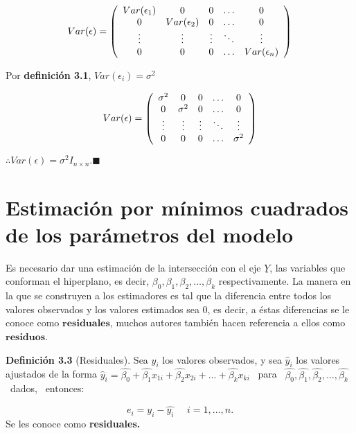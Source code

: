 \documentclass[
  a4paper,
  oneside,
  openany]{book}
\begin{document}
\[
Var(\epsilon)=
\left(
\begin{array}{c c c c c}
Var(\epsilon_{1}) & 0 & 0 & \ldots & 0 \\ 
0&Var(\epsilon_{2}) & 0 & \ldots & 0 \\
\vdots & \vdots & \vdots & \ddots & \vdots\\
0 & 0 & 0 & \ldots & Var(\epsilon_{n})\\
\end{array}
\right)
\]

Por \textbf{definición 3.1}, \(Var(\epsilon_{i})=\sigma^2\)

\[
Var(\epsilon)=
\left(
\begin{array}{c c c c c}
\sigma^2 & 0 & 0 & \ldots & 0 \\ 
0&\sigma^2 & 0 & \ldots & 0 \\
\vdots & \vdots & \vdots & \ddots & \vdots\\
0 & 0 & 0 & \ldots &\sigma^2  \\
\end{array}
\right)
\]

\(\therefore Var(\epsilon)=\sigma^2 I_{n \times n}. \blacksquare\)

\hypertarget{estimaciuxf3n-por-muxednimos-cuadrados-de-los-paruxe1metros-del-modelo-2}{%
\section{Estimación por mínimos cuadrados de los parámetros del modelo}\label{estimaciuxf3n-por-muxednimos-cuadrados-de-los-paruxe1metros-del-modelo-2}}

Es necesario dar una estimación de la intersección con el eje \(\underline{Y}\), las variables que conforman el hiperplano, es decir, \(\beta_{0},\beta_{1},\beta_{2},\ldots,\beta_{k}\) respectivamente. La manera en la que se construyen a los estimadores es tal que la diferencia entre todos los valores observados y los valores estimados sea 0, es decir, a éstas diferencias se le conoce como \(\mathbf{residuales}\), muchos autores también hacen referencia a ellos como \(\mathbf{residuos}\).

\textbf{Definición 3.3} (Residuales). Sea \(y_{i}\) los valores observados, y sea \(\hat{y}_{i}\) los valores ajustados de la forma \(\hat{y}_{i}=\hat{\beta_{0}}+\hat{\beta_{1}}x_{1i}+\hat{\beta_{2}}x_{2i}+ \ldots +\hat{\beta_{k}}x_{ki}\) ~para ~\(\hat{\beta_{0}},\hat{\beta_{1}},\hat{\beta_{2}}, \ldots, \hat{\beta_{k}}\) ~dados, ~entonces:

\[e_{i}=y_{i}-\hat{y_{i}} \ \ \ \ \ \ i=1, \ldots,n.\]
Se les conoce como \textbf{residuales.}
\end{document}
